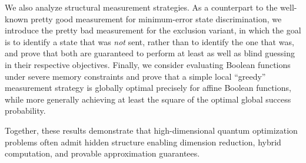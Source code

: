 
We also analyze structural measurement strategies. 
As a counterpart to the well-known pretty good measurement for minimum-error state discrimination, we introduce the pretty bad measurement for the exclusion variant, in which the goal is to identify a state that was \emph{not} sent, rather than to identify the one that was, and prove that both are guaranteed to perform at least as well as blind guessing in their respective objectives. 
Finally, we consider evaluating Boolean functions under severe memory constraints and prove that a simple local ``greedy'' measurement strategy is globally optimal precisely for affine Boolean functions, while more generally achieving at least the square of the optimal global success probability.


Together, these results demonstrate that high-dimensional quantum optimization problems often admit hidden structure enabling dimension reduction, hybrid computation, and provable approximation guarantees.